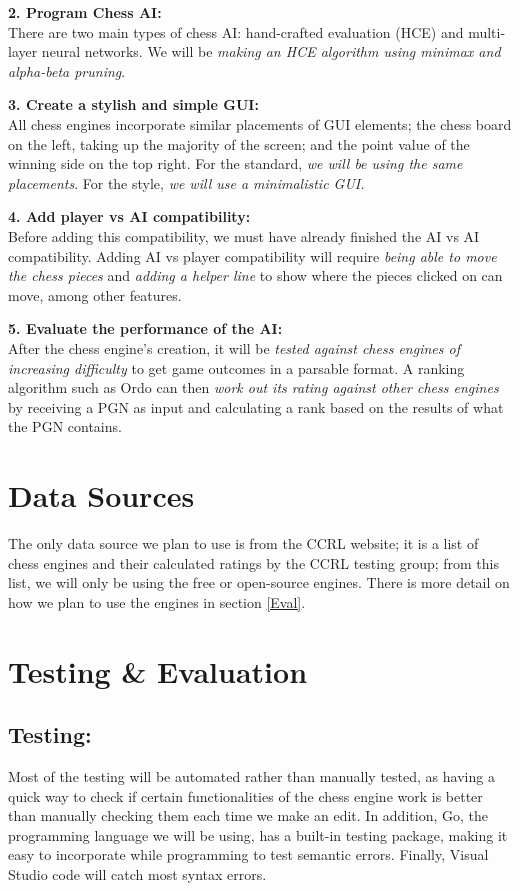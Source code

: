 \documentclass{article}
\begin{document}
\noindent\textbf{2. Program Chess AI:}\\
There are two main types of chess AI: hand-crafted evaluation (HCE) and multi-layer neural networks\cite{chessprog:eval}. We will be \emph{making an HCE algorithm using minimax and alpha-beta pruning}.

\noindent\textbf{3. Create a stylish and simple GUI:}\\
All chess engines incorporate similar placements of GUI elements\cite{chess.com}\cite{lichess}\cite{chess24}; the chess board on the left, taking up the majority of the screen; and the point value of the winning side on the top right. For the standard, \emph{we will be using the same placements}. For the style, \emph{we will use a minimalistic GUI.}

\noindent\textbf{4. Add player vs AI compatibility:}\\
Before adding this compatibility, we must have already finished the AI vs AI compatibility. Adding AI vs player compatibility will require \emph{being able to move the chess pieces} and \emph{adding a helper line} to show where the pieces clicked on can move, among other features.

\noindent\textbf{5. Evaluate the performance of the AI:}\\
After the chess engine's creation, it will be \emph{tested against chess engines of increasing difficulty} to get game outcomes in a parsable format. A ranking algorithm such as Ordo\cite{ordo} can then \emph{work out its rating against other chess engines} by receiving a PGN\cite{wiki:PGN} as input and calculating a rank based on the results of what the PGN contains.

\section{Data Sources} %
The only data source we plan to use is from the CCRL website\cite{ccrl}; it is a list of chess engines and their calculated ratings by the CCRL testing group; from this list, we will only be using the free or open-source engines. There is more detail on how we plan to use the engines in section \ref{Eval}.

\section{Testing \& Evaluation} %
\subsection{Testing:}
Most of the testing will be automated rather than manually tested, as having a quick way to check if certain functionalities of the chess engine work is better than manually checking them each time we make an edit. In addition, Go, the programming language we will be using, has a built-in testing package, making it easy to incorporate while programming to test semantic errors. Finally, Visual Studio code will catch most syntax errors.
\end{document}
